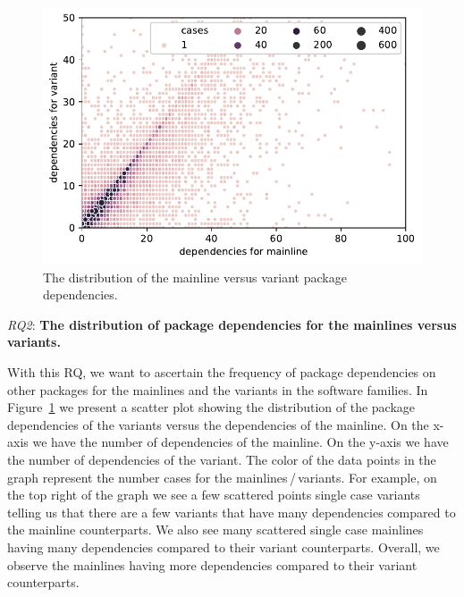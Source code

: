 \begin{figure}[htbp]
\vspace{-.3cm}
   \centering
    \includegraphics[scale=0.6]{figures/benevolj_dependencies.pdf}
    \caption{The distribution of the mainline versus variant package dependencies.}
    \label{fig:dependencies}
\end{figure}


\textit{RQ2}: \textbf{The distribution of package dependencies for the mainlines versus variants.}

With this RQ, we want to ascertain the frequency of package dependencies on other packages for the mainlines and the variants in the software families. 
In Figure~\ref{fig:dependencies} we present a scatter plot showing the distribution of the package dependencies of the variants versus the dependencies of the mainline.
On the x-axis we have the number of dependencies of the mainline. 
On the y-axis we have the number of dependencies of the variant.
The color of the data points in the graph represent the number cases for the mainlines\,/\,variants.
For example, on the top right of the graph we see a few scattered points single case variants telling us that there are a few variants that have many dependencies compared to the mainline counterparts.
We also see many scattered single case mainlines having many dependencies compared to their variant counterparts. 
Overall, we observe the mainlines having more dependencies compared to their variant counterparts.

